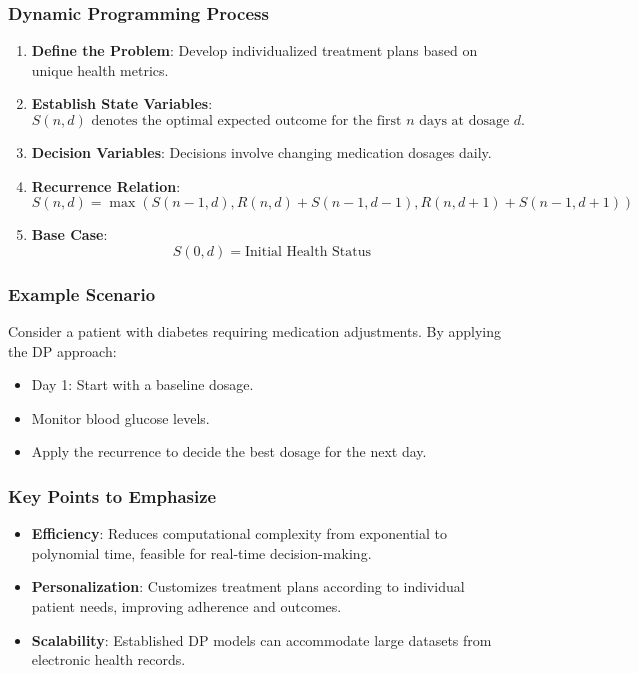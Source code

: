 \documentclass[aspectratio=169]{beamer}
\begin{document}
\begin{frame}[fragile]
    \frametitle{Dynamic Programming Process}
    \begin{enumerate}
        \item \textbf{Define the Problem}: Develop individualized treatment plans based on unique health metrics.
        \item \textbf{Establish State Variables}: 
            \[
            S(n, d) \text{ denotes the optimal expected outcome for the first } n \text{ days at dosage } d.
            \]
        \item \textbf{Decision Variables}: Decisions involve changing medication dosages daily.
        \item \textbf{Recurrence Relation}:
            \[
            S(n, d) = \max \left( S(n-1, d), R(n, d) + S(n-1, d-1), R(n, d+1) + S(n-1, d+1) \right)
            \]
        \item \textbf{Base Case}:
            \[
            S(0, d) = \text{Initial Health Status}
            \]
    \end{enumerate}
\end{frame}

\begin{frame}[fragile]
    \frametitle{Example Scenario}
    Consider a patient with diabetes requiring medication adjustments. By applying the DP approach:
    \begin{itemize}
        \item Day 1: Start with a baseline dosage.
        \item Monitor blood glucose levels.
        \item Apply the recurrence to decide the best dosage for the next day.
    \end{itemize}
\end{frame}

\begin{frame}[fragile]
    \frametitle{Key Points to Emphasize}
    \begin{itemize}
        \item \textbf{Efficiency}: Reduces computational complexity from exponential to polynomial time, feasible for real-time decision-making.
        \item \textbf{Personalization}: Customizes treatment plans according to individual patient needs, improving adherence and outcomes.
        \item \textbf{Scalability}: Established DP models can accommodate large datasets from electronic health records.
    \end{itemize}
\end{frame}
\end{document}
